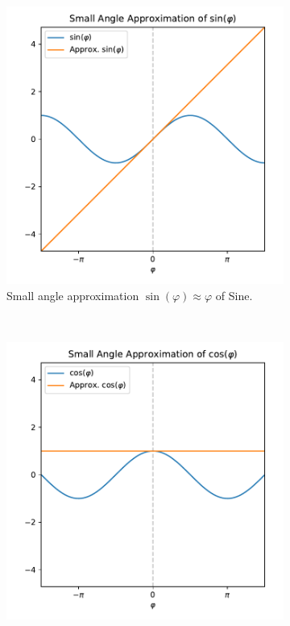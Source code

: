 	\begin{figure}
		\centering
		\begin{subfigure}[t]{0.5\linewidth}
			\centering
			\includegraphics[width = \linewidth]{figures/introduction/generated/small-angle-approximation-sin.pdf}
			\caption{Small angle approximation \( \sin(\varphi) \approx \varphi \) of Sine.}
		\end{subfigure}%
		~
		\begin{subfigure}[t]{0.5\linewidth}
			\centering
			\includegraphics[width = \linewidth]{figures/introduction/generated/small-angle-approximation-cos.pdf}

\end{subfigure}
\end{figure}
